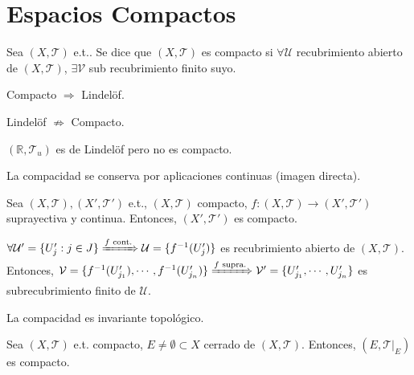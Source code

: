 \chapter{Espacios Compactos}

\begin{defn}[Compacto]
  Sea $ ( X, \mathcal{T} )$ e.t.. Se dice que $(  X, \mathcal{T} )$ es compacto si $\forall \mathcal{U}$ recubrimiento abierto de $( X, \mathcal{T} )$, $\exists \mathcal{V}$ sub recubrimiento finito suyo.
\end{defn}

\begin{obs}
  Compacto $\Rightarrow$ Lindelöf.
\end{obs}

\begin{obs}
  Lindelöf $\not \Rightarrow$ Compacto.
\end{obs}

\begin{ejm}
  $( \mathbb{R}, \mathcal{T}_{u} )$ es de Lindelöf pero no es compacto.
\end{ejm}

\begin{obs}
  La compacidad se conserva por aplicaciones continuas (imagen directa).
\end{obs}

\begin{prop}
  Sea $( X, \mathcal{T} ), ( X', \mathcal{T}' )$ e.t., $( X, \mathcal{T} )$ compacto, $f : ( X, \mathcal{T} ) \to ( X', \mathcal{T}' )$ suprayectiva y continua. Entonces, $( X', \mathcal{T}' )$ es compacto.
\end{prop}

\begin{dem}
  $\forall \mathcal{U}' = \{  U_{j}' : j \in J \} \xRightarrow[]{ f \text{ cont.} } \mathcal{U} = \{ f^{-1}(U_{j}') \}$ es recubrimiento abierto de $( X, \mathcal{T} )$. Entonces, $\mathcal{V} = \{ f^{-1}(U'_{j_{1}}), \cdots, f^{-1}(U_{j_{n}}') \} \xRightarrow[]{ f \text{ supra.} } \mathcal{V}' = \{  U_{j_{1}}', \cdots, U_{j_{n}}' \}$ es subrecubrimiento finito de $\mathcal{U}$.
\end{dem}

\begin{cor}
  La compacidad es invariante topológico.
\end{cor}

\begin{prop}
  Sea $( X, \mathcal{T} )$ e.t. compacto, $E \neq \emptyset \subset X$ cerrado de $ ( X, \mathcal{T} )$. Entonces, $( E, \mathcal{T}|_{E})$ es compacto.
\end{prop}

